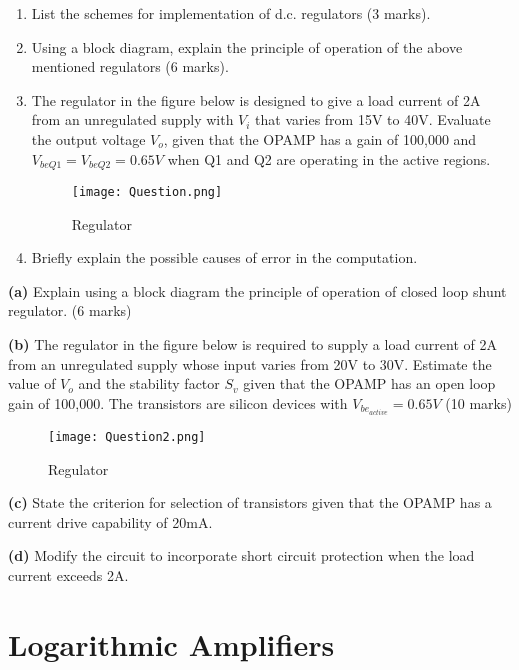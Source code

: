 \documentclass[a4paper,9pt,twoside,openany,twocolumn]{memoir}
\begin{document}
\begin{enumerate}
    \item List the schemes for implementation of d.c. regulators (3 marks).
    
    \item Using a block diagram, explain the principle of operation of the above mentioned regulators (6 marks).
    
    \item The regulator in the figure below is designed to give a load current of 2A from an unregulated supply with \( V_i \) that varies from 15V to 40V. Evaluate the output voltage \( V_o \), given that the OPAMP has a gain of 100,000 and \( V_{beQ1} = V_{beQ2} = 0.65V \) when Q1 and Q2 are operating in the active regions.
    \begin{figure}[H]
    \centering
    \texttt{[image: Question.png]}
    \caption{Regulator}
    \label{fig:question_image}
\end{figure}

    \item Briefly explain the possible causes of error in the computation.
\end{enumerate}

\textbf{(a)} Explain using a block diagram the principle of operation of closed loop shunt regulator. \hspace{1cm} (6 marks)

\textbf{(b)} The regulator in the figure below is required to supply a load current of 2A from an unregulated supply whose input varies from 20V to 30V. Estimate the value of \(V_o\) and the stability factor \(S_v\) given that the OPAMP has an open loop gain of 100,000. The transistors are silicon devices with \(V_{be_{active}} = 0.65V\) \hspace{1cm} (10 marks)
\begin{figure}[H]
    \centering
    \texttt{[image: Question2.png]}
    \caption{Regulator}
    \label{fig:question_image}
\end{figure}


\textbf{(c)} State the criterion for selection of transistors given that the OPAMP has a current drive capability of 20mA.

\textbf{(d)} Modify the circuit to incorporate short circuit protection when the load current exceeds 2A.

\chapter{Logarithmic Amplifiers}
\end{document}
